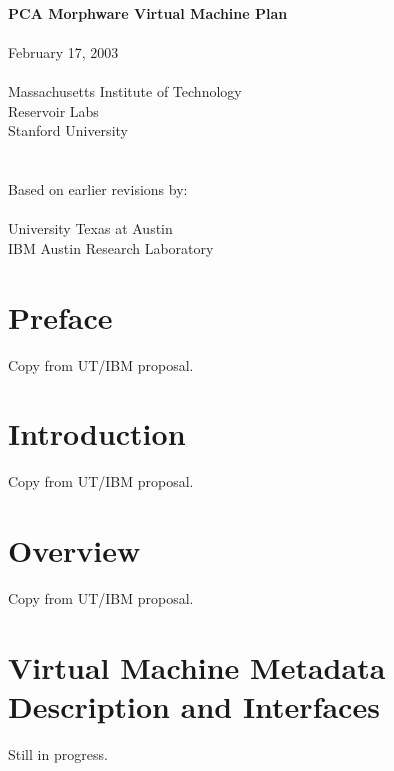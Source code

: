 \documentclass[10pt]{article}
\begin{document}
  \begin{titlepage}
    \begin{center}
      {\LARGE
	~ \\ ~ \\ ~ \\ ~ \\ ~ \\ ~ \\ ~ \\ ~ \\
	{\bf PCA Morphware Virtual Machine Plan \\ ~ \\}
      }
      {\Large
	February 17, 2003 \\ ~ \\
      }
      {\large
	Massachusetts Institute of Technology \\ Reservoir Labs \\ Stanford University \\ ~ \\ ~ \\ 
	Based on earlier revisions by: \\ ~ \vspace{-8pt} \\
	University Texas at Austin \\ IBM Austin Research Laboratory
      }
    \end{center}
  \end{titlepage}

  \newcommand{\mt}[1]{\mbox{\it #1}}
  \newcommand{\todo}[1]{\framebox{\bf #1}}
  \newcommand{\sss}[1]{\medskip \noindent {\bf #1} \smallskip}
  \newcommand{\ssss}[1]{\medskip \noindent {\bf #1:}}

  \tableofcontents

  \clearpage
  \section*{Preface}
  Copy from UT/IBM proposal.
  \section{Introduction}
  Copy from UT/IBM proposal.
  \section{Overview}
  Copy from UT/IBM proposal.

  \section{Virtual Machine Metadata Description and Interfaces}
  Still in progress.
\end{document}
